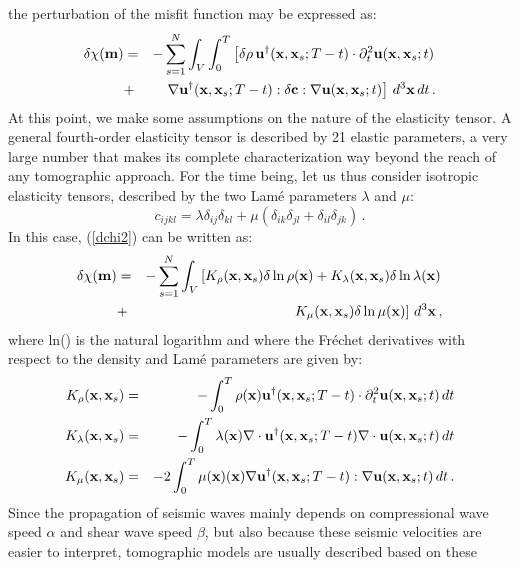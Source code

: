 the perturbation of the misfit function may be expressed as:
\begin{eqnarray}
\delta\chi(\mathbf{m}) & = & - \sum_{s=1}^N\nonumber \int_V \int_0^T \left[\delta\rho \, \mathbf{u}^\dagger(\mathbf{x},\mathbf{x}_s;T-t)\cdot
\partial^2_{t}\mathbf{u}(\mathbf{x},\mathbf{x}_s;t) \right. \nonumber \\
& +  & \left. \nabla\mathbf{u}^\dagger(\mathbf{x},\mathbf{x}_s;T-t):\delta \mathbf{c}: \nabla \mathbf{u}(\mathbf{x},\mathbf{x}_s;t) \right] \, d^3\mathbf{x} \, dt \, .
\label{dchi2}
\end{eqnarray}
At this point, we make some assumptions on the nature of the elasticity tensor.
A general fourth-order elasticity tensor is described by 21 elastic parameters, a very large number that makes its complete characterization
way beyond the reach of any tomographic approach. For the time being, let us thus consider isotropic elasticity tensors,
described by the two Lam\'e parameters $\lambda$ and $\mu$:
\begin{equation}
c_{ijkl} = \lambda \delta_{ij}\delta_{kl}+\mu(\delta_{ik}\delta_{jl}+\delta_{il}\delta_{jk}) \, .
\end{equation}
In this case, (\ref{dchi2}) can be written as:
\begin{eqnarray}
\delta\chi(\mathbf{m}) & = & - \sum_{s=1}^N\nonumber \int_V \left[ K_\rho(\mathbf{x},\mathbf{x}_s)\delta\ln\rho(\mathbf{x})
+K_\lambda(\mathbf{x},\mathbf{x}_s)\delta\ln\lambda(\mathbf{x}) \right. \nonumber \\
& + & \left. K_\mu(\mathbf{x},\mathbf{x}_s)\delta\ln\mu(\mathbf{x})\right] \, d^3\mathbf{x} \, ,
\label{dchi2_1}
\end{eqnarray}
where ln() is the natural logarithm and where the Fr\'echet derivatives with respect to the density and Lam\'e parameters are given by:
\begin{eqnarray}
K_\rho(\mathbf{x},\mathbf{x}_s) & = & - \int_0^T \rho(\mathbf{x}) \mathbf{u}^\dagger(\mathbf{x},\mathbf{x}_s;T-t)\cdot \partial^2_{t}\mathbf{u}(\mathbf{x},\mathbf{x}_s;t) \, dt \\
K_\lambda(\mathbf{x},\mathbf{x}_s) & = & - \int_0^T \lambda(\mathbf{x}) \nabla\cdot\mathbf{u}^\dagger(\mathbf{x},\mathbf{x}_s;T-t) \nabla\cdot\mathbf{u}(\mathbf{x},\mathbf{x}_s;t) \, dt \\
K_\mu(\mathbf{x},\mathbf{x}_s) & = & -2 \int_0^T \mu(\mathbf{x}) (\mathbf{x}) \nabla\mathbf{u}^\dagger(\mathbf{x},\mathbf{x}_s;T-t) :\nabla\mathbf{u}(\mathbf{x},\mathbf{x}_s;t)\, dt \, .
\end{eqnarray}
Since the propagation of seismic waves mainly depends on compressional wave speed $\alpha$ and shear wave speed $\beta$,
but also because these seismic velocities are easier to interpret, tomographic models are usually described based on these

